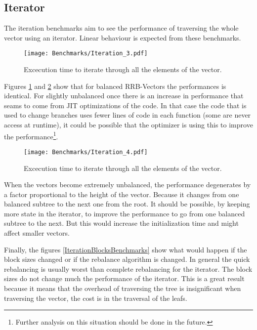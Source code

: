 \FloatBarrier

\subsection{Iterator}
The iteration benchmarks aim to see the performance of traversing the whole vector using an iterator. Linear behaviour is expected from these benchmarks.

\begin{figure}[h!]
  \centering
  \texttt{[image: Benchmarks/Iteration\_3.pdf]}
  \caption{Excecution time to iterate through all the elements of the vector.}
  \label{Iteration2Benchmarks}
\end{figure}

Figures \ref{Iteration2Benchmarks} and \ref{Iteration3Benchmarks} show that for balanced RRB-Vectors the performances is identical. For slightly unbalanced once there is an increase in performance that seams to come from JIT optimizations of the code. In that case the code that is used to change branches uses fewer lines of code in each function (some are never access at runtime), it could be possible that the optimizer is using this to improve the performance\footnote{Further analysis on this situation should be done in the future.}. 

\begin{figure}[h!]
  \centering
  \texttt{[image: Benchmarks/Iteration\_4.pdf]}
  \caption{Excecution time to iterate through all the elements of the vector.}
  \label{Iteration3Benchmarks}
\end{figure}

When the vectors become extremely unbalanced, the performance degenerates by a factor proportional to the height of the vector. Because it changes from one balanced subtree to the next one from the root. It should be possible, by keeping more state in the iterator, to improve the performance to go from one balanced subtree to the next. But this would increase the initialization time and might affect smaller vectors.

\FloatBarrier

Finally, the figures \ref{IterationBlocksBenchmarks} show what would happen if the block sizes changed or if the rebalance algorithm is changed. In general the quick rebalancing is usually worst than complete rebalancing for the iterator. The block sizes do not change much the performance of the iterator. This is a great result because it means that the overhead of traversing the tree is insignificant when traversing the vector, the cost is in the traversal of the leafs.

